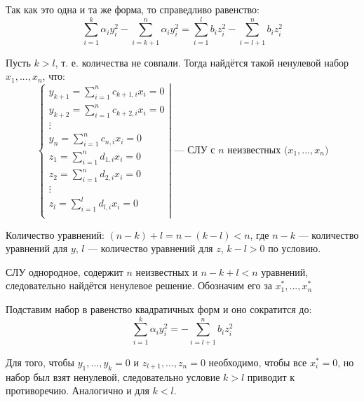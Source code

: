 \documentclass[12pt]{article}
\begin{document}
Так как это одна и та же форма, то справедливо равенство:
\[
    \sum^k_{i=1}\alpha_{i}y_i^2 - \sum^n_{i=k + 1}\alpha_{i}y_i^2 = \sum_{i=1}^lb_iz_i^2 - \sum_{i = l + 1}^nb_iz_i^2
\]

Пусть $k > l$, т. е. количества не совпали. Тогда найдётся такой ненулевой набор $x_1, ..., x_n$, что:
\[
    \left.\begin{cases}
        y_{k + 1} = \sum_{i = 1}^{n}c_{k + 1,i}x_i = 0 \\
        y_{k + 2} = \sum_{i = 1}^{n}c_{k + 2,i}x_i = 0 \\
        \vdots                                         \\
        y_{n} = \sum_{i = 1}^{n}c_{n,i}x_i = 0         \\
        z_{1} = \sum_{i = 1}^{n}d_{1,i}x_i = 0         \\
        z_{2} = \sum_{i = 1}^{n}d_{2,i}x_i = 0         \\
        \vdots                                         \\
        z_{l} = \sum_{i = 1}^{l}d_{l,i}x_i = 0         \\
    \end{cases}\right|
    \text{ — СЛУ с $n$ неизвестных ($x_1, ..., x_n$)}
\]

Количество уравнений: $(n - k) + l = n - (k - l) < n$, где $n - k$ — количество уравнений для $y$, $l$ — количество уравнений для $z$, $k - l > 0$ по условию.

СЛУ однородное, содержит $n$ неизвестных и $n - k + l < n$ уравнений, следовательно найдётся ненулевое решение. Обозначим его за $x_1^*, ..., x_n^*$

Подставим набор в равенство квадратичных форм и оно сократится до:
\[
    \sum^k_{i=1}\alpha_{i}y_i^2 = -\sum_{i = l + 1}^nb_iz_i^2
\]

Для того, чтобы $y_{1}, ..., y_k = 0$ и $z_{l + 1}, ..., z_n = 0$ необходимо, чтобы все $x_i^* = 0$, но набор был взят ненулевой, следовательно условие $k > l$ приводит к противоречию. Аналогично и для $k < l$.
\end{document}
